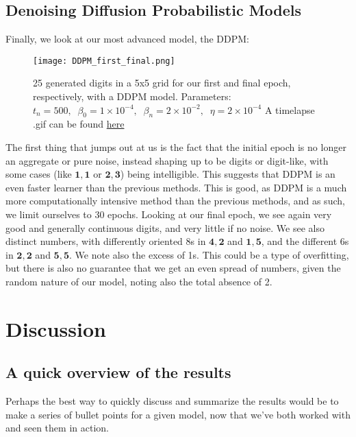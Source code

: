 \documentclass{article}
\begin{document}
\subsection{Denoising Diffusion Probabilistic Models}
Finally, we look at our most advanced model, the DDPM:
\begin{figure}[ht!]
    \centering
    \texttt{[image: DDPM\_first\_final.png]}
    \caption{25 generated digits in a 5x5 grid for our first and final epoch, respectively, with a DDPM model. \newline
    Parameters: $t_n = 500, \; \; \beta_0 = 1\times10^{-4}, \; \; \beta_n = 2\times 10^{-2}, \; \;  \eta = 2\times10^{-4}$
    \newline 
    A timelapse .gif can be found \href{https://github.com/simloken/Generative_Imaging/blob/main/Figures/DDPM_evolution.gif}{here}}
    \label{figDDPM}
\end{figure}
\newline
The first thing that jumps out at us is the fact that the initial epoch is no longer an aggregate or pure noise, instead shaping up to be digits or digit-like, with some cases (like $\mathbf{1,1}$ or $\mathbf{2,3}$) being intelligible. This suggests that DDPM is an even faster learner than the previous methods. \newline
This is good, as DDPM is a much more computationally intensive method than the previous methods, and as such, we limit ourselves to 30 epochs. Looking at our final epoch, we see again very good and generally continuous digits, and very little if no noise. We see also distinct numbers, with differently oriented 8s in $\mathbf{4,2}$ and $\mathbf{1,5}$, and the different 6s in $\mathbf{2,2}$ and $\mathbf{5,5}$. 
\newline
We note also the excess of 1s. This could be a type of overfitting, but there is also no guarantee that we get an even spread of numbers, given the random nature of our model, noting also the total absence of 2.
\newpage
\section{Discussion}
\subsection{A quick overview of the results}
Perhaps the best way to quickly discuss and summarize the results would be to make a series of bullet points for a given model, now that we've both worked with and seen them in action.
\end{document}
